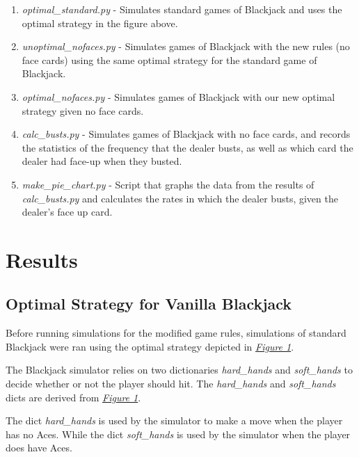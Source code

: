 \documentclass{article}
\begin{document}
{		\begin{enumerate}
			\item \textit{optimal\_standard.py} - Simulates standard games of Blackjack and uses the optimal strategy in the figure above.
			\item \textit{unoptimal\_nofaces.py} - Simulates games of Blackjack with the new rules (no face cards) using the same optimal strategy for the standard game of Blackjack.
			\item \textit{optimal\_nofaces.py} - Simulates games of Blackjack with our new optimal strategy given no face cards.
			\item \textit{calc\_busts.py} - Simulates games of Blackjack with no face cards, and records the statistics of the frequency that the dealer busts, as well as which card the dealer 
				had face-up when they busted.
			\item \textit{make\_pie\_chart.py} - Script that graphs the data from the results of \textit{calc\_busts.py} and calculates
				the rates in which the dealer busts, given the dealer's face up card.
		\end{enumerate}

\vspace{0.5cm}
		
\section{Results}
\label{sec: Results}

    \subsection{Optimal Strategy for Vanilla Blackjack}
	\label{Optimal Strategy for Vanilla Blackjack}
		
		Before running simulations for the modified game rules, simulations of standard Blackjack were ran using the optimal strategy depicted in \hyperlink{fig1}{\textit{Figure 1}}.
		
		The Blackjack simulator relies on two dictionaries \textit{hard\_hands} and \textit{soft\_hands} to decide whether or not the player should hit.
		The \textit{hard\_hands} and \textit{soft\_hands} dicts are derived from \hyperlink{fig1}{\textit{Figure 1}}.

		The dict \textit{hard\_hands} is used by the simulator to make a move when the player has no Aces. While the dict
		\textit{soft\_hands} is used by the simulator when the player does have Aces.

}
\end{document}
